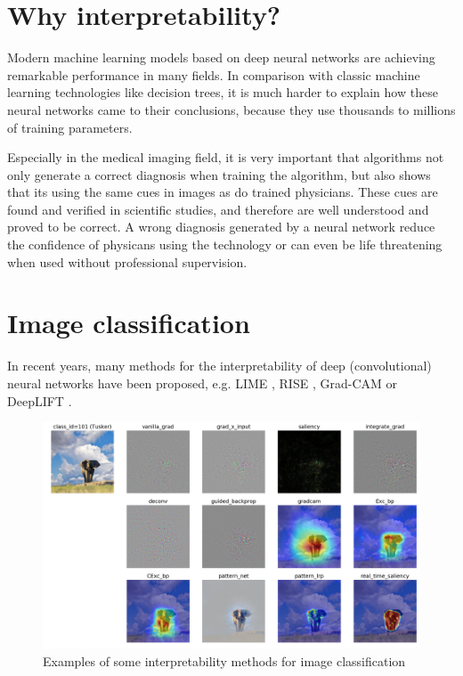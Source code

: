 \section{Why interpretability?}
Modern machine learning models based on deep neural networks are achieving remarkable performance in many fields. In comparison with classic machine learning technologies like decision trees, it is much harder to explain how these neural networks came to their conclusions, because they use thousands to millions of training parameters.

Especially in the medical imaging field, it is very important that algorithms not only generate a correct diagnosis when training the algorithm, but also shows that its using the same cues in images as do trained physicians. These cues are found and verified in scientific studies, and therefore are well understood and proved to be correct. A wrong diagnosis generated by a neural network reduce the confidence of physicans using the technology or can even be life threatening when used without professional supervision.

\section{Image classification}
In recent years, many methods for the interpretability of deep (convolutional) neural networks have been proposed, e.g. LIME \cite{ribeiro2016should}, RISE \cite{Petsiuk2018rise}, Grad-CAM \cite{selvaraju2017grad} or DeepLIFT \cite{shrikumar2017learning}.

\begin{figure}[h]
\centering
\caption{Examples of some interpretability methods for image classification \cite{visualattribution}}
\includegraphics[width=14cm]{images/tusker_saliency.png}
\end{figure}

